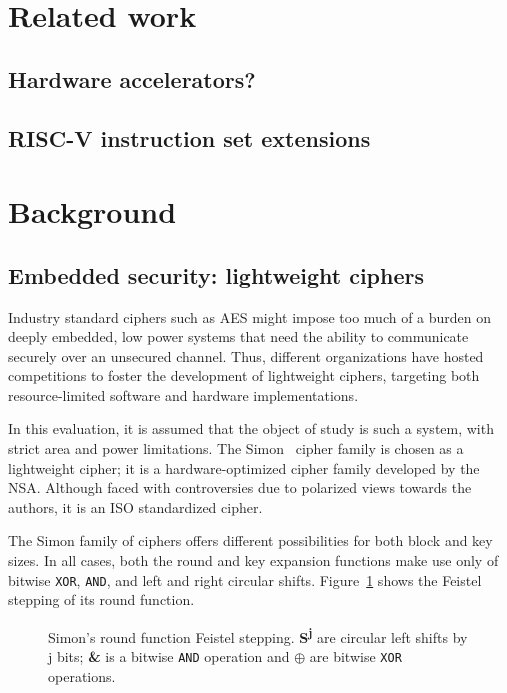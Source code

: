 \documentclass[10pt,conference]{IEEEtran}
\begin{document}
\section{Related work}

\subsection{Hardware accelerators?}

\subsection{RISC-V instruction set extensions}

\section{Background}


\subsection{Embedded security: lightweight ciphers}

Industry standard ciphers such as AES might impose too much of a burden on deeply
embedded, low power systems that need the ability to communicate securely over
an unsecured channel. Thus, different organizations have hosted competitions to
foster the development of lightweight ciphers, targeting both resource-limited
software and hardware implementations.

In this evaluation, it is assumed that the object of study is such a system,
with strict area and power limitations. The Simon~\cite{Beaulieu2015} cipher family is chosen as a
lightweight cipher; it is a hardware-optimized cipher family developed by the
NSA. Although faced with controversies due to polarized views towards the
authors, it is an ISO standardized cipher.

The Simon family of ciphers offers different possibilities for both block and
key sizes. In all cases, both the round and key expansion functions make use
only of bitwise \texttt{XOR}, \texttt{AND}, and left and right circular shifts.
Figure~\ref{fig:simonround} shows the Feistel stepping of its round function.

\begin{figure}
  \centering
  
  \caption{Simon's round function Feistel stepping. \textbf{S\textsuperscript{j}} are
    circular left shifts by j bits; \textbf{\&} is a bitwise \texttt{AND}
    operation and $\oplus$ are bitwise \texttt{XOR} operations.}
  \label{fig:simonround}
\end{figure}
\end{document}
